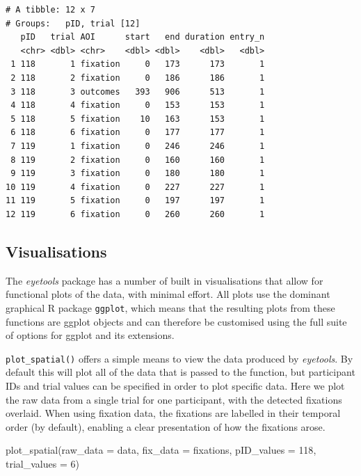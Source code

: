 \documentclass[
  man,
  floatsintext,
  longtable,
  nolmodern,
  notxfonts,
  notimes,
  colorlinks=true,linkcolor=blue,citecolor=blue,urlcolor=blue]{apa7}
\newenvironment{Shaded}{\begin{snugshade}}{\end{snugshade}}
\newcommand{\AttributeTok}[1]{\textcolor[rgb]{0.40,0.45,0.13}{#1}}
\newcommand{\DecValTok}[1]{\textcolor[rgb]{0.68,0.00,0.00}{#1}}
\newcommand{\FunctionTok}[1]{\textcolor[rgb]{0.28,0.35,0.67}{#1}}
\newcommand{\NormalTok}[1]{\textcolor[rgb]{0.00,0.23,0.31}{#1}}
\begin{document}
\begin{verbatim}
# A tibble: 12 x 7
# Groups:   pID, trial [12]
   pID   trial AOI      start   end duration entry_n
   <chr> <dbl> <chr>    <dbl> <dbl>    <dbl>   <dbl>
 1 118       1 fixation     0   173      173       1
 2 118       2 fixation     0   186      186       1
 3 118       3 outcomes   393   906      513       1
 4 118       4 fixation     0   153      153       1
 5 118       5 fixation    10   163      153       1
 6 118       6 fixation     0   177      177       1
 7 119       1 fixation     0   246      246       1
 8 119       2 fixation     0   160      160       1
 9 119       3 fixation     0   180      180       1
10 119       4 fixation     0   227      227       1
11 119       5 fixation     0   197      197       1
12 119       6 fixation     0   260      260       1
\end{verbatim}

\subsection{Visualisations}\label{visualisations}

The \emph{eyetools} package has a number of built in visualisations that
allow for functional plots of the data, with minimal effort. All plots
use the dominant graphical R package \texttt{ggplot}, which means that
the resulting plots from these functions are ggplot objects and can
therefore be customised using the full suite of options for ggplot and
its extensions.

\texttt{plot\_spatial()} offers a simple means to view the data produced
by \emph{eyetools}. By default this will plot all of the data that is
passed to the function, but participant IDs and trial values can be
specified in order to plot specific data. Here we plot the raw data from
a single trial for one participant, with the detected fixations
overlaid. When using fixation data, the fixations are labelled in their
temporal order (by default), enabling a clear presentation of how the
fixations arose.

\begin{Shaded}
\begin{Highlighting}[]
\FunctionTok{plot\_spatial}\NormalTok{(}\AttributeTok{raw\_data =}\NormalTok{ data,}
             \AttributeTok{fix\_data =}\NormalTok{ fixations,}
             \AttributeTok{pID\_values =} \DecValTok{118}\NormalTok{,}
             \AttributeTok{trial\_values =} \DecValTok{6}\NormalTok{)}
\end{Highlighting}
\end{Shaded}
\end{document}
